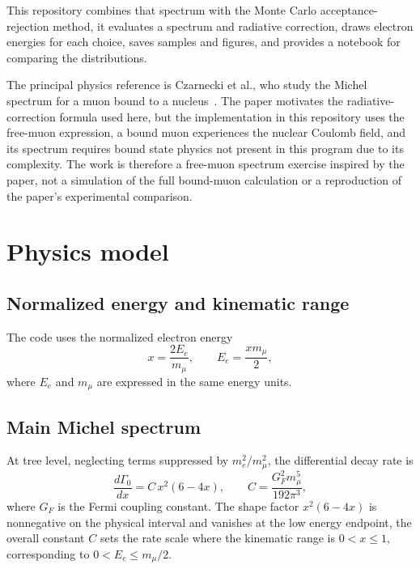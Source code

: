 \documentclass[conference]{IEEEtran}
\begin{document}
This repository combines that spectrum with the Monte Carlo acceptance-rejection method, it evaluates a spectrum and radiative correction, draws electron energies for each choice, saves samples and figures, and provides a notebook for comparing the distributions.

The principal physics reference is Czarnecki et al., who study the Michel spectrum for a muon bound to a nucleus~\cite{Czarnecki_2014}. The paper motivates the radiative-correction formula used here, but the implementation in this repository uses the free-muon expression, a bound muon experiences the nuclear Coulomb field, and its spectrum requires bound state physics not present in this program due to its complexity. The work is therefore a free-muon spectrum exercise inspired by the paper, not a simulation of the full bound-muon calculation or a reproduction of the paper's experimental comparison.

\section{Physics model}

\subsection{Normalized energy and kinematic range}

The code uses the normalized electron energy
\begin{equation}
    x = \frac{2E_e}{m_\mu}, \qquad E_e = \frac{x m_\mu}{2},
    \label{eq:x-definition}
\end{equation}
where $E_e$ and $m_\mu$ are expressed in the same energy units.

\subsection{Main Michel spectrum}

At tree level, neglecting terms suppressed by $m_e^2/m_\mu^2$, the differential decay rate is
\begin{equation}
    \frac{d\Gamma_0}{dx}
    = C\,x^2(6-4x), \qquad
    C = \frac{G_F^2 m_\mu^5}{192\pi^3},
    \label{eq:tree-spectrum}
\end{equation}
where $G_F$ is the Fermi coupling constant. The shape factor $x^2(6-4x)$ is nonnegative on the physical interval and vanishes at the low energy endpoint, the overall constant $C$ sets the rate scale where the kinematic range is $0<x\le 1$, corresponding to $0<E_e\le m_\mu/2$.
\end{document}
